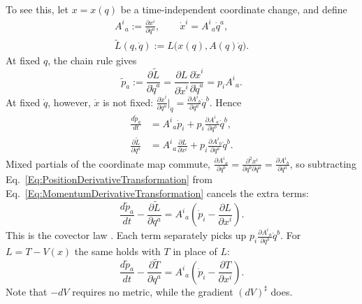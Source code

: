 To see this, let $x=x(q)$ be a time-independent coordinate change, and
define
\begin{equation}\label{Eq:CoordinateJacobianForEL}
\begin{gathered}
 A^i{}_a:=\frac{\partial x^i}{\partial q^a},\qquad
 \dot x^i=A^i{}_a\dot q^a,\\
 \widetilde L(q,\dot q):=L\bigl(x(q),A(q)\dot q\bigr).
\end{gathered}
\end{equation}
At fixed $q$, the chain rule gives
\begin{equation}\label{Eq:MomentumCovectorTransformation}
 \widetilde p_a:=\frac{\partial\widetilde L}{\partial\dot q^a}
 =\frac{\partial L}{\partial\dot x^i}
   \frac{\partial\dot x^i}{\partial\dot q^a}
 =p_i A^i{}_a .
\end{equation}
At fixed $\dot q$, however, $\dot x$ is not fixed:
$\frac{\partial\dot x^i}{\partial q^a}\big|_{\dot q}
=\frac{\partial A^i{}_b}{\partial q^a}\dot q^b$. Hence
\begin{align}
 \frac{d\widetilde p_a}{dt}
 &=A^i{}_a\dot p_i+p_i\frac{\partial A^i{}_a}{\partial q^b}\dot q^b,
 \label{Eq:MomentumDerivativeTransformation}\\
 \frac{\partial\widetilde L}{\partial q^a}
 &=A^i{}_a\frac{\partial L}{\partial x^i}
   +p_i\frac{\partial A^i{}_b}{\partial q^a}\dot q^b.
 \label{Eq:PositionDerivativeTransformation}
\end{align}
Mixed partials of the coordinate map commute,
$\frac{\partial A^i{}_a}{\partial q^b}
=\frac{\partial^2x^i}{\partial q^b\partial q^a}
=\frac{\partial A^i{}_b}{\partial q^a}$, so subtracting
Eq.~\ref{Eq:PositionDerivativeTransformation} from
Eq.~\ref{Eq:MomentumDerivativeTransformation} cancels the extra terms:
\begin{equation}\label{Eq:ELCovectorTransformation}
 \frac{d\widetilde p_a}{dt}-\frac{\partial\widetilde L}{\partial q^a}
 =A^i{}_a\left(\dot p_i-\frac{\partial L}{\partial x^i}\right).
\end{equation}
This is the covector law \cite[Section 2.2]{tongdynamics}. Each term
separately picks up $p_i\frac{\partial A^i{}_a}{\partial q^b}\dot q^b$.
For $L=T-V(x)$ the same holds with $T$ in place of $L$:
\begin{equation}\label{Eq:KineticELCovectorTransformation}
 \frac{d\widetilde p_a}{dt}-\frac{\partial\widetilde T}{\partial q^a}
 =A^i{}_a\left(\dot p_i-\frac{\partial T}{\partial x^i}\right).
\end{equation}
Note that $-dV$ requires no metric, while the gradient $(dV)^\sharp$ does.

